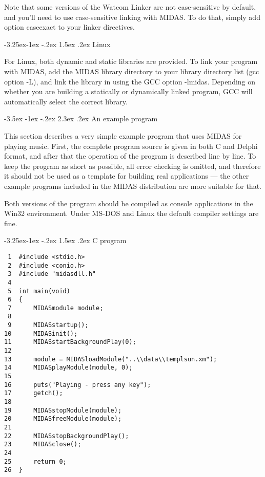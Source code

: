 \documentclass[a4paper,12pt,oneside]{book}
\makeatletter
\renewcommand\section{\@startsection {section}{1}{-20pt}%
                                   {-3.5ex \@plus -1ex \@minus -.2ex}%
                                   {2.3ex \@plus.2ex}%
                                   {\normalfont\Large\bfseries}}
\renewcommand\subsection{\@startsection{subsection}{2}{-20pt}%
                                     {-3.25ex\@plus -1ex \@minus -.2ex}%
                                     {1.5ex \@plus .2ex}%
                                     {\normalfont\large\bfseries}}
\newcommand{\mResWord}[1]{{\ttfamily #1}}
\makeatother
\begin{document}
Note that some versions of the Watcom Linker are not case-sensitive by
default, and you'll need to use case-sensitive linking with MIDAS. To do
that, simply add \mResWord{option caseexact} to your linker directives.



\subsection{Linux}

For Linux, both dynamic and static libraries are provided. To link your
program with MIDAS, add the MIDAS library directory to your library directory
list (gcc option \mResWord{-L}), and link the library in using the GCC option
\mResWord{-lmidas}. Depending on whether you are building a statically or
dynamically linked program, GCC will automatically select the correct
library.



\section{An example program}

This section describes a very simple example program that uses MIDAS for
playing music. First, the complete program source is given in both C and
Delphi format, and after that the operation of the program is described line
by line. To keep the program as short as possible, all error checking is
omitted, and therefore it should not be used as a template for building real
applications --- the other example programs included in the MIDAS
distribution are more suitable for that.

Both versions of the program should be compiled as console applications in
the Win32 environment. Under MS-DOS and Linux the default compiler settings
are fine.


\subsection{C program}

\begin{verbatim}
 1  #include <stdio.h>
 2  #include <conio.h>
 3  #include "midasdll.h"
 4
 5  int main(void)
 6  {
 7      MIDASmodule module;
 8
 9      MIDASstartup();
10      MIDASinit();
11      MIDASstartBackgroundPlay(0);
12
13      module = MIDASloadModule("..\\data\\templsun.xm");
14      MIDASplayModule(module, 0);
15
16      puts("Playing - press any key");
17      getch();
18
19      MIDASstopModule(module);
20      MIDASfreeModule(module);
21
22      MIDASstopBackgroundPlay();
23      MIDASclose();
24
25      return 0;
26  }
\end{verbatim}
\end{document}
